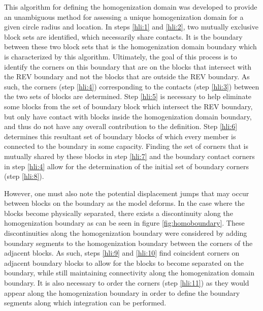 This algorithm for defining the homogenization domain was developed
to provide an unambiguous method for assessing a unique homogenization
domain for a given circle radius and location. In steps \ref{hli:1}
and \ref{hli:2}, two mutually exclusive block sets are identified,
which necessarily share contacts. It is the boundary between these
two block sets that is the homogenization domain boundary which is
characterized by this algorithm. Ultimately, the goal of this process
is to identify the corners on this boundary that are on the blocks
that intersect with the REV boundary and not the blocks that are outside
the REV boundary. As such, the corners (step \ref{hli:4}) corresponding
to the contacts (step \ref{hli:3}) between the two sets of blocks
are determined. Step \ref{hli:5} is necessary to help eliminate some
blocks from the set of boundary block which intersect the REV boundary,
but only have contact with blocks inside the homogenization domain
boundary, and thus do not have any overall contribution to the definition.
Step \ref{hli:6} determines this resultant set of boundary blocks
of which every member is connected to the boundary in some capacity.
Finding the set of corners that is mutually shared by these blocks
in step \ref{hli:7} and the boundary contact corners in step \ref{hli:4}
allow for the determination of the initial set of boundary corners
(step \ref{hli:8}).

However, one must also note the potential displacement jumps that
may occur between blocks on the boundary as the model deforms. In
the case where the blocks become physically separated, there exists
a discontinuity along the homogenization boundary as can be seen in figure
\ref{fig:homoboundary}. These discontinuities along the homogenization
boundary were considered by adding boundary segments to the homogenization
boundary between the corners of the adjacent blocks. As such, steps
\ref{hli:9} and \ref{hli:10} find coincident corners on adjacent
boundary blocks to allow for the blocks to become separated on the
boundary, while still maintaining connectivity along the homogenization
domain boundary. It is also necessary to order the corners (step \ref{hli:11})
as they would appear along the homogenization boundary in order to
define the boundary segments along which integration can be performed.

